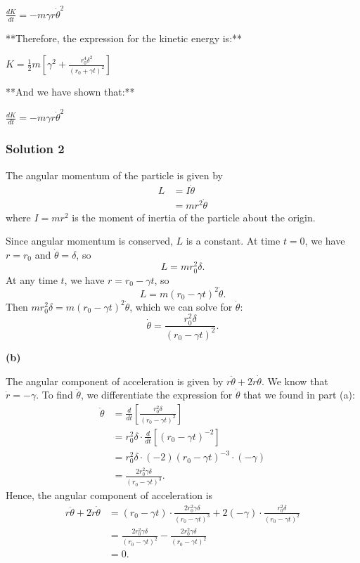 \documentclass{article}
\begin{document}
   $\frac{dK}{dt} = -m \gamma r \dot{\theta}^2$

**Therefore, the expression for the kinetic energy is:**

$K = \frac{1}{2}m \left[ \gamma^2 + \frac{r_0^4 \delta^2}{(r_0 + \gamma t)^2} \right]$

**And we have shown that:**

$\boxed{\frac{dK}{dt} = -m \gamma r \dot{\theta}^2}$ 


\subsubsection{Solution 2}
The angular momentum of the particle is given by 
\begin{align*}
L &= I \dot{\theta} \\
&= mr^2 \dot{\theta}
\end{align*}
where \( I = mr^2 \) is the moment of inertia of the particle about the origin.

Since angular momentum is conserved, \( L \) is a constant.  At time \( t = 0 \), we have \( r = r_0 \) and \( \dot{\theta} = \delta \), so
\[L = mr_0^2 \delta.\]At any time \( t \), we have \( r = r_0 - \gamma t \), so
\[L = m (r_0 - \gamma t)^2 \dot{\theta}.\]Then \( mr_0^2 \delta = m (r_0 - \gamma t)^2 \dot{\theta} \), which we can solve for \( \dot{\theta} \):
\[\dot{\theta} = \frac{r_0^2 \delta}{(r_0 - \gamma t)^2}.\]

\textbf{(b)} 

The angular component of acceleration is given by \( r \ddot{\theta} + 2 \dot{r} \dot{\theta} \).  We know that \( \dot{r} = -\gamma \).  To find \( \ddot{\theta} \), we differentiate the expression for \( \dot{\theta} \) that we found in part (a):
\begin{align*}
\ddot{\theta} &= \frac{d}{dt} \left[ \frac{r_0^2 \delta}{(r_0 - \gamma t)^2} \right] \\
&= r_0^2 \delta \cdot \frac{d}{dt} \left[ (r_0 - \gamma t)^{-2} \right] \\
&= r_0^2 \delta \cdot (-2) (r_0 - \gamma t)^{-3} \cdot (-\gamma) \\
&= \frac{2 r_0^2 \gamma \delta}{(r_0 - \gamma t)^3}.
\end{align*}Hence, the angular component of acceleration is
\begin{align*}
r \ddot{\theta} + 2 \dot{r} \dot{\theta} &= (r_0 - \gamma t) \cdot \frac{2 r_0^2 \gamma \delta}{(r_0 - \gamma t)^3} + 2 (-\gamma) \cdot \frac{r_0^2 \delta}{(r_0 - \gamma t)^2} \\
&= \frac{2 r_0^2 \gamma \delta}{(r_0 - \gamma t)^2} - \frac{2 r_0^2 \gamma \delta}{(r_0 - \gamma t)^2} \\
&= 0.
\end{align*}
\end{document}
